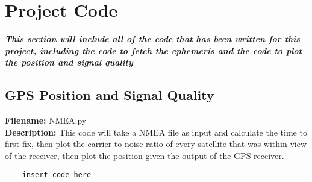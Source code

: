 
\chapter{Project Code} %

\label{AppendixA} %

\textbf{\emph{This section will include all of the code that has been written for this project, including the code to fetch the ephemeris and the code to plot the
position and signal quality}}

\section{GPS Position and Signal Quality}
\textbf{Filename:} NMEA.py\\
\textbf{Description:} This code will take a NMEA file as input and calculate the time to first fix, then plot the carrier to noise ratio of every satellite that was
within view of the receiver, then plot the position given the output of the GPS receiver.

\begin{verbatim}
    insert code here
\end{verbatim}
